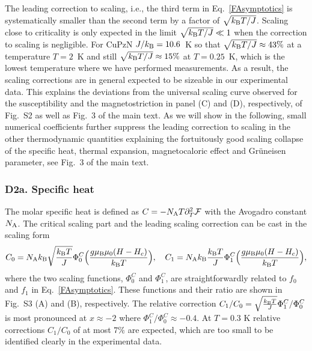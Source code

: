 \documentclass[12pt]{article}
\begin{document}
The leading correction to scaling, i.e., the third term in Eq.~\eqref{FAsymptotics} is systematically smaller than the second term by a factor of $\sqrt{k_{\rm B} T/J}$. Scaling close to criticality is only expected in the limit $\sqrt{k_{\rm B} T/J} \ll 1$ when the correction to scaling is negligible. For CuPzN $J/k_{\rm B} = 10.6$~K so that $\sqrt{k_{\rm B} T/J} \approx 43\%$ at a temperature $T = 2$~K and still $\sqrt{k_{\rm B} T/J} \approx 15\%$ at $T = 0.25$~K, which is the lowest temperature where we have performed measurements. As a result, the scaling corrections are in general expected to be sizeable in our experimental data. 
This explains the deviations from the universal scaling curve observed for the susceptibility and the magnetostriction in panel (C) and (D), respectively, of Fig.~{S2} as well as Fig.~3 of the main text. As we will show in the following, small numerical coefficients further suppress the leading correction to scaling in the other thermodynamic quantities explaining the fortuitously good scaling collapse of the specific heat, thermal expansion, magnetocaloric effect and Gr\"uneisen parameter, see Fig.~3 of the main text.


\subsubsection*{D2a. Specific heat}


The molar specific heat is defined as $C = - N_{\rm A} T\partial^2_T \mathcal{F}$ with the Avogadro constant $N_{\rm A}$.
The critical scaling part and the leading scaling correction can be cast in the scaling form
%
\begin{align}
C_0 =  N_{\rm A} k_{\rm B} \sqrt{\frac{k_{\rm B} T}{J}} \Phi^C_0\Big(\frac{g\mu_{\rm B} \mu_0 (H-H_c)}{k_{\rm B} T}\Big),\quad
C_{1} = N_{\rm A} k_{\rm B} \frac{k_{\rm B} T}{J} \Phi^C_1\Big(\frac{g\mu_{\rm B} \mu_0 (H-H_c)}{k_{\rm B} T}\Big),
\end{align}
%
where the two scaling functions,  $\Phi^C_0$ and $\Phi^C_1$, are straightforwardly related to $f_0$ and $f_1$ in Eq.~\eqref{FAsymptotics}. These functions and their ratio are shown in Fig.~{S3} (A) and (B), respectively. 
%
The relative correction $C_{1}/C_0 = \sqrt{\frac{k_{\rm B} T}{J}} \Phi^C_1/\Phi^C_0$ is most pronounced at $x \approx -2$ where $\Phi^C_1/\Phi^C_0\approx -0.4$. At $T = 0.3$ K relative corrections $C_1/C_0$ of at most $7\%$ are expected, which are too small to be identified clearly  in the experimental data.
\end{document}
